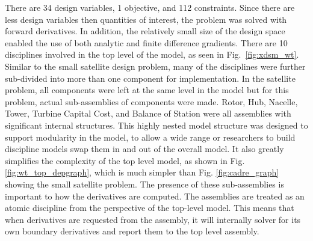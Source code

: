 \documentclass[]{aiaa-tc} %
\begin{document}
    There are 34 design variables, 1 objective, and 112 constraints. Since there are
    less design variables then quantities of interest, the problem was solved with
    forward derivatives. In addition, the relatively small size of the design space
    enabled the use of both analytic and finite difference gradients. There are 10 disciplines 
    involved in the top level of the model, as seen in Fig.~\ref{fig:xdsm_wt}. Similar to the small 
    satellite design problem, many of the disciplines were further
    sub-divided into more than one component for implementation. In the
    satellite problem, all components were left at the same level in the model but for this problem, 
    actual sub-assemblies of components were made. Rotor, Hub, Nacelle, Tower, Turbine Capital Cost, 
    and Balance of Station were all assemblies with significant internal structures. 
    This highly nested model structure was designed to support modularity in the model, 
    to allow a wide range or researchers to build discipline models swap them in and out 
    of the overall model. It also greatly simplifies the complexity of the top level model, 
    as shown in Fig. \ref{fig:wt_top_depgraph}, which is much simpler than Fig. \ref{fig:cadre_graph} 
    showing the small satellite problem. The presence of these sub-assemblies is important to how the derivatives are computed. 
    The assemblies are treated as an atomic discipline from the perspective of the top-level model. 
    This means that when derivatives are requested from the assembly, it will internally solver 
    for its own boundary derivatives and report them to the top level assembly. 
\end{document}

